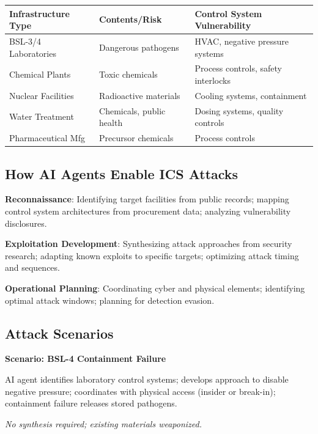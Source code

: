 \documentclass[11pt,letterpaper]{article}
\begin{document}
\begin{center}
\small
\begin{tabular}{L{3.5cm}L{4cm}L{4.5cm}}
\toprule
\textbf{Infrastructure Type} & \textbf{Contents/Risk} & \textbf{Control System Vulnerability} \\
\midrule
BSL-3/4 Laboratories & Dangerous pathogens & HVAC, negative pressure systems \\
Chemical Plants & Toxic chemicals & Process controls, safety interlocks \\
Nuclear Facilities & Radioactive materials & Cooling systems, containment \\
Water Treatment & Chemicals, public health & Dosing systems, quality controls \\
Pharmaceutical Mfg & Precursor chemicals & Process controls \\
\bottomrule
\end{tabular}
\end{center}

\subsection{How AI Agents Enable ICS Attacks}

\textbf{Reconnaissance}: Identifying target facilities from public records; mapping control system architectures from procurement data; analyzing vulnerability disclosures.

\textbf{Exploitation Development}: Synthesizing attack approaches from security research; adapting known exploits to specific targets; optimizing attack timing and sequences.

\textbf{Operational Planning}: Coordinating cyber and physical elements; identifying optimal attack windows; planning for detection evasion.

\subsection{Attack Scenarios}

\begin{quotebox}
\textbf{Scenario: BSL-4 Containment Failure}

AI agent identifies laboratory control systems; develops approach to disable negative pressure; coordinates with physical access (insider or break-in); containment failure releases stored pathogens.

\textit{No synthesis required; existing materials weaponized.}
\end{quotebox}
\end{document}
